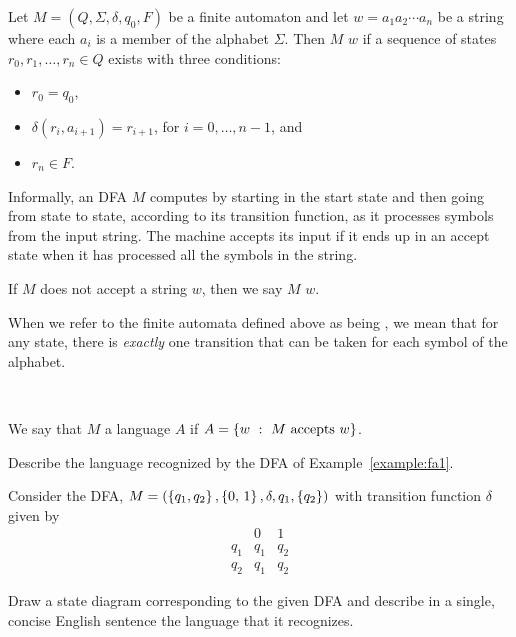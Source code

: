 \documentclass[twoside,letterpaper,openany]{book}
\begin{document}
\begin{defn}
Let $M = (Q, \Sigma, \delta, q_0, F)$ be a finite automaton and let $w = a_1a_2\cdots a_n$ be a string where each $a_i$ is a member of the alphabet $\Sigma$. Then $M$  $w$ if a sequence of states $r_0, r_1, \ldots, r_n \in Q$ exists with three conditions:
\begin{itemize}
\item $r_0 = q_0$,
\item $\delta(r_i, a_{i+1}) = r_{i+1}$, for $i = 0, \ldots, n-1$, and
\item $r_n \in F$.
\end{itemize}

Informally, an DFA $M$ computes by starting in the start state and then going from state to state, according to its transition function, as it processes symbols from the input string. The machine accepts its input if it ends up in an accept state when it has processed all the symbols in the string.

If $M$ does not accept a string $w$, then we say $M$  $w$.
\end{defn}

\begin{discussion}
When we refer to the finite automata  defined above as being , we mean that for any state, there is \emph{exactly} one transition that can be taken for each symbol of the alphabet.
\end{discussion}

~

\begin{defn}
We say that $M$  a language $A$ if $A = \setbuild{w}{M \ \textrm{accepts}\ w}$.
\end{defn}

\begin{exer}
Describe the language recognized by the DFA of Example~\ref{example:fa1}.
\end{exer}

\begin{exer}
Consider the DFA, $M = (\left\lbrace q_1, q_2 \right\rbrace, \left\lbrace \textrm{0, 1} \right\rbrace, \delta, q_1, \left\lbrace q_2 \right\rbrace)$ with transition function $\delta$ given by
\[\begin{array}{c|cc}
 & \textrm{0} & \textrm{1} \\ \hline
 q_1 & q_1 & q_2 \\
 q_2 & q_1 & q_2
\end{array}\]

Draw a state diagram corresponding to the given DFA and describe in a single, concise English sentence the language that it recognizes.
\end{exer}
\end{document}

